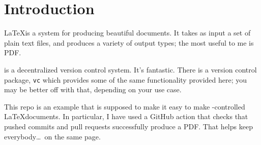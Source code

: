 \section{Introduction}\label{sec:intro}

\LaTeX is a system for producing beautiful documents.
It takes as input a set of plain text files, and produces a variety of output types; the most useful to me is PDF.

\git is a decentralized version control system.
It's fantastic.
There is a version control package, \texttt{vc}\cite{vc} which provides some of the same functionality provided here; you may be better off with that, depending on your use case.

This repo\cite{latex-base} is an example that is supposed to make it easy to make \git-controlled \LaTeX documents.
In particular, I have used a GitHub action that checks that pushed commits and pull requests successfully produce a PDF.
That helps keep everybody\ldots\ on the same page.

